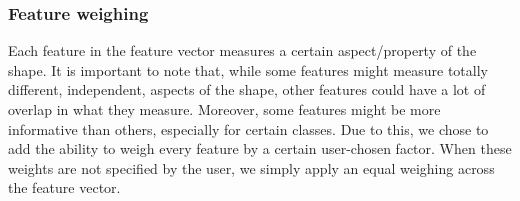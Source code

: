 \begin{table}[ht]
    \centering
    \caption{Distance functions}
    \label{tab:distance-functions}
\end{table}

\subsubsection{Feature weighing}
Each feature in the feature vector measures a certain aspect/property of the shape.
It is important to note that, while some features might measure totally different, independent, aspects of the shape,
other features could have a lot of overlap in what they measure.
Moreover, some features might be more informative than others, especially for certain classes.
Due to this, we chose to add the ability to weigh every feature by a certain user-chosen factor.
When these weights are not specified by the user, we simply apply an equal weighing across the feature vector.


